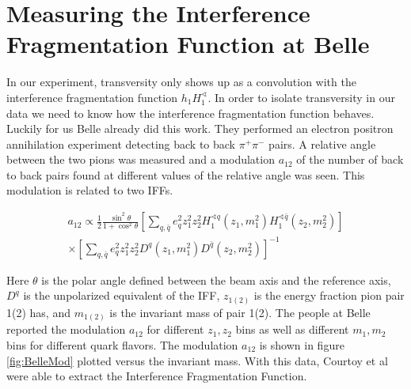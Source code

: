 \documentclass[abstract = on,listof=totoc, bibliography=totoc]{scrreprt}
\begin{document}
\FloatBarrier
\section{Measuring the Interference Fragmentation Function at Belle}

In our experiment, transversity only shows up as a convolution with the interference fragmentation function $h_1H_1^\sphericalangle$. In order to isolate transversity in our data we need to know how the interference fragmentation function behaves. Luckily for us Belle already did this work. They performed an electron positron annihilation experiment detecting back to back $\pi^+\pi^-$ pairs. A relative angle between the two pions was measured and a modulation $a_{12}$ of the number of back to back pairs found at different values of the relative angle was seen. This modulation is related to two IFFs. 
     
\begin{multline}
a_{12} \propto \frac{1}{2} \frac{\sin^2\theta}{1+\cos^2\theta} \left[ \sum_{q,\bar{q}}e_q^2z_1^2z_2^2H_1^{\sphericalangle q}(z_1, m_1^2)H_1^{\sphericalangle \bar{q}}(z_2, m_2^2)\right] \\ \times \left[ \sum_{q,\bar{q}}e_q^2z_1^2z_2^2D^{q}(z_1, m_1^2)D^{\bar{q}}(z_2, m_2^2)\right]^{-1}
\end{multline}

Here $\theta$ is the polar angle defined between the beam axis and the reference axis, $D^q$ is the unpolarized equivalent of the IFF, $z_{1(2)}$ is the energy fraction pion pair 1(2) has, and $m_{1(2)}$ is the invariant mass of pair 1(2). The people at Belle reported the modulation $a_{12}$ for different $z_1,z_2$ bins as well as different $m_1,m_2$ bins for different quark flavors. The modulation $a_{12}$ is shown in figure \ref{fig:BelleMod} plotted versus the invariant mass. With this data, Courtoy et al were able to extract the Interference Fragmentation Function.\cite{extractIFF}
\end{document}
